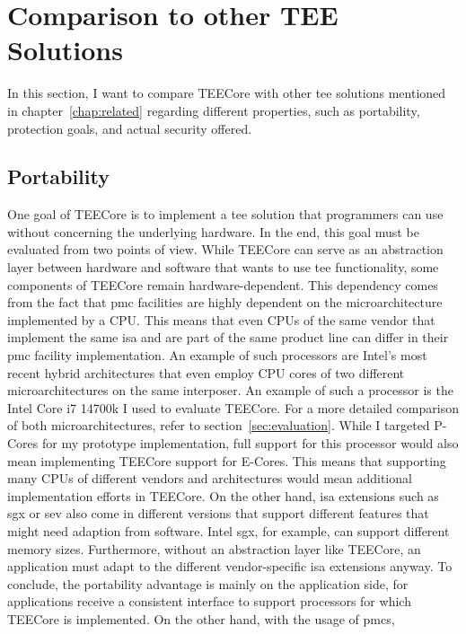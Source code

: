 \section{Comparison to other TEE Solutions}
\label{eval:compare}
In this section, I want to compare TEECore with other \gls{tee} solutions
mentioned in chapter~\ref{chap:related} regarding different properties, such as
portability, protection goals, and actual security offered.

\subsection{Portability}
\label{eval:compare:portability}
One goal of TEECore is to implement a \gls{tee} solution that programmers can
use without concerning the underlying hardware. In the end, this goal must be
evaluated from two points of view. While TEECore can serve as an abstraction
layer between hardware and software that wants to use \gls{tee} functionality,
some components of TEECore remain hardware-dependent. This dependency comes from
the fact that \gls{pmc} facilities are highly dependent on the microarchitecture
implemented by a CPU. This means that even CPUs of the same vendor that
implement the same \gls{isa} and are part of the same product line can differ in
their \gls{pmc} facility implementation. An example of such processors are
Intel's most recent hybrid architectures that even employ CPU cores of two
different microarchitectures on the same interposer. An example of such a
processor is the Intel Core i7 14700k I used to evaluate TEECore. For a more
detailed comparison of both microarchitectures, refer to
section~\ref{sec:evaluation}. While I targeted P-Cores for my prototype
implementation, full support for this processor would also mean implementing
TEECore support for E-Cores. This means that supporting many CPUs of different
vendors and architectures would mean additional implementation efforts in
TEECore. On the other hand, \gls{isa} extensions such as \gls{sgx} or \gls{sev}
also come in different versions that support different features that might need
adaption from software. Intel \gls{sgx}, for example, can support different
memory sizes. Furthermore, without an abstraction layer like TEECore, an
application must adapt to the different vendor-specific \gls{isa} extensions
anyway. To conclude, the portability advantage is mainly on the application
side, for applications receive a consistent interface to support processors for
which TEECore is implemented. On the other hand, with the usage of \glspl{pmc},
